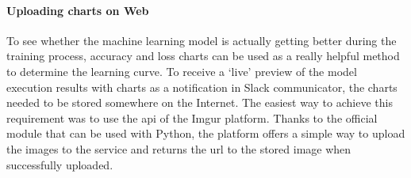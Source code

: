 \paragraph{Uploading charts on Web}\label{para:charts-web-uploading}
To see whether the machine learning model is actually getting better during the training process, accuracy and loss charts can be used as a really helpful method to determine the learning curve.
To receive a `live' preview of the model execution results with charts as a notification in Slack communicator, the charts needed to be stored somewhere on the Internet.
The easiest way to achieve this requirement was to use the \gls{api} of the Imgur platform.
Thanks to the official module that can be used with Python, the platform offers a simple way to upload the images to the service and returns the \gls{url} to the stored image when successfully uploaded.
